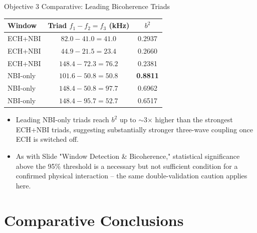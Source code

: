 \documentclass[aspectratio=169]{beamer}
\begin{document}
\begin{frame}{Objective 3 Comparative: Leading Bicoherence Triads}
    \small
    \centering
    \begin{tabular}{lcc}
        \toprule
        Window & Triad $f_1 - f_2 = f_3$ (kHz) & $b^2$ \\
        \midrule
        ECH+NBI  & $82.0 - 41.0 = 41.0$   & 0.2937 \\
        ECH+NBI  & $44.9 - 21.5 = 23.4$   & 0.2660 \\
        ECH+NBI  & $148.4 - 72.3 = 76.2$  & 0.2381 \\
        \midrule
        NBI-only & $101.6 - 50.8 = 50.8$  & \textbf{0.8811} \\
        NBI-only & $148.4 - 50.8 = 97.7$  & 0.6962 \\
        NBI-only & $148.4 - 95.7 = 52.7$  & 0.6517 \\
        \bottomrule
    \end{tabular}
    \vspace{0.3cm}
    \normalsize
    \begin{itemize}
        \item Leading NBI-only triads reach $b^2$ up to $\sim$3$\times$ higher than the strongest ECH+NBI triads, suggesting substantially stronger three-wave coupling once ECH is switched off.
        \item As with Slide "Window Detection \& Bicoherence," statistical significance above the 95\% threshold is a necessary but not sufficient condition for a confirmed physical interaction -- the same double-validation caution applies here.
    \end{itemize}
\end{frame}

\section{Comparative Conclusions}
\end{document}
